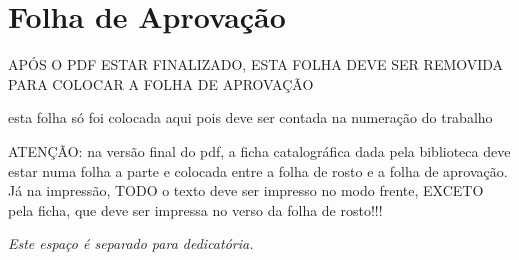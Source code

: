 \documentclass[12pt,oneside]{book} %
\begin{document}





    \chapter*{Folha de Aprovação}
    \thispagestyle{empty}

    APÓS O PDF ESTAR FINALIZADO, ESTA FOLHA DEVE SER REMOVIDA PARA COLOCAR A FOLHA DE APROVAÇÃO

    esta folha só foi colocada aqui pois deve ser contada na numeração do trabalho

    \vspace{2cm}

    ATENÇÃO: na versão final do pdf, a ficha catalográfica dada pela biblioteca deve estar numa folha a parte e colocada entre a folha de rosto e a folha de aprovação. Já na impressão, TODO o texto deve ser impresso no modo frente, EXCETO pela ficha, que deve ser impressa no verso da folha de rosto!!!












    \newpage
    \thispagestyle{empty}

    \begin{flushright}
        \begin{minipage}{5cm}
            \begin{flushright}
                \vspace{23cm}\textit{Este espaço é separado para dedicatória.}
            \end{flushright}
        \end{minipage}
    \end{flushright}
\end{document}

